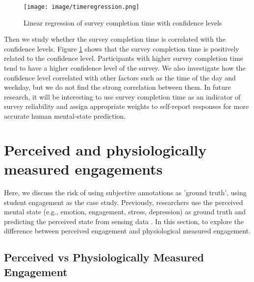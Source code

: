 \documentclass[sigconf]{acmart}
\begin{document}
\begin{figure}
    \centering
    \texttt{[image: image/timeregression.png]}
    \caption{Linear regression of survey completion time with confidence levels }
    \label{fig:regression}
\end{figure}

Then we study whether the survey completion time is correlated with the confidence levels. Figure \ref{fig:regression} shows that the survey completion time is positively related to the confidence level. Participants with higher survey completion time tend to have a higher confidence level of the survey. We also investigate how the confidence level correlated with other factors such as the time of the day and weekday, but we do not find the strong correlation between them. In future research, it will be interesting to use survey completion time as an indicator of survey reliability and assign appropriate weights to self-report responses for more accurate human mental-state prediction.
\begin{comment}
\begin{figure}
    \centering
    \texttt{[image: image/result.pdf]}
    \caption{Prediction performance across different classifiers}
    \label{fig:my_label}
\end{figure}
\end{comment}
\section{Perceived and physiologically measured engagements}
\label{sec:contrasting}
Here, we discuss the risk of using subjective annotations as 'ground truth', using student engagement as the case study. Previously, researchers use the perceived mental state (e.g., emotion, engagement, stress, depression) as ground truth and predicting the perceived state from sensing data \cite{gao2020n,king2019microstress,personalitysensing2018wang}. In this section,  
to explore the difference between perceived engagement and physiological measured engagement. 

\subsection{Perceived vs Physiologically Measured Engagement}
\end{document}
